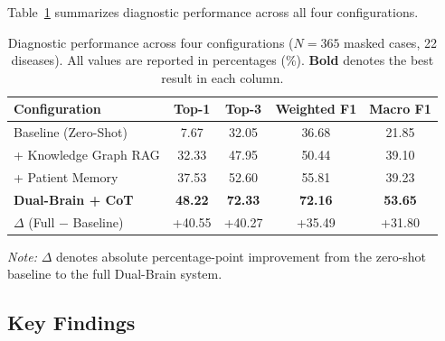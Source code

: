\documentclass{article}
\begin{document}
Table~\ref{tab:results} summarizes diagnostic performance across all four configurations.

\begin{table}[H]
\centering
\caption{Diagnostic performance across four configurations ($N = 365$ masked cases, 22 diseases). All values are reported in percentages (\%). \textbf{Bold} denotes the best result in each column.}
\label{tab:results}
\small
\setlength{\tabcolsep}{10pt}
\begin{tabular}{@{}l cccc@{}}
\toprule
\textbf{Configuration} & \textbf{Top-1} & \textbf{Top-3} & \textbf{Weighted F1} & \textbf{Macro F1} \\
\midrule
Baseline (Zero-Shot)          & 7.67  & 32.05 & 36.68 & 21.85 \\
+ Knowledge Graph RAG         & 32.33 & 47.95 & 50.44 & 39.10 \\
+ Patient Memory              & 37.53 & 52.60 & 55.81 & 39.23 \\
\textbf{Dual-Brain + CoT}     & \textbf{48.22} & \textbf{72.33} & \textbf{72.16} & \textbf{53.65} \\
\midrule
$\Delta$ (Full $-$ Baseline)  & +40.55 & +40.27 & +35.49 & +31.80 \\
\bottomrule
\end{tabular}

\vspace{4pt}
{\footnotesize \emph{Note:} $\Delta$ denotes absolute percentage-point improvement from the zero-shot baseline to the full Dual-Brain system.}
\end{table}

\subsection{Key Findings}
\end{document}
